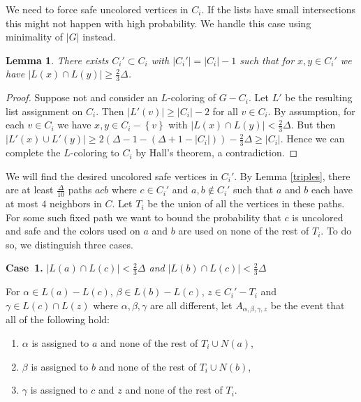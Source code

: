 \documentclass[12pt]{article}
\theoremstyle{plain}
\newtheorem{lem}[thm]{Lemma}
\theoremstyle{definition}
\theoremstyle{remark}
\newcommand{\set}[1]{\left\{ #1 \right\}}
\newcommand{\card}[1]{\left|#1\right|}
\begin{document}
We need to force safe uncolored vertices in $C_i$.  If the lists have small
intersections this might not happen with high probability.  We handle this case
using minimality of $\card{G}$ instead.

\begin{lem}\label{LargeIntersections}
There exists $C_i' \subset C_i$ with $\card{C_i'} = \card{C_i} - 1$ such that
for $x, y \in C_i'$ we have $\card{L(x) \cap L(y)} \geq \frac23 \Delta$.
\end{lem}
\begin{proof}
Suppose not and consider an $L$-coloring of $G - C_i$.  Let $L'$ be the
resulting list assignment on $C_i$.  Then $\card{L'(v)} \geq \card{C_i} - 2$ for
all $v \in C_i$.  By assumption, for each $v \in C_i$ we have $x, y \in C_i -
\set{v}$ with $\card{L(x) \cap L(y)} < \frac23 \Delta$.  But then $\card{L'(x) \cup
L'(y)} \geq 2(\Delta - 1 - (\Delta + 1 - \card{C_i})) - \frac23 \Delta \geq
\card{C_i}$.  Hence we can complete the $L$-coloring to $C_i$ by Hall's theorem,
a contradiction.
\end{proof}

We will find the desired uncolored safe vertices in $C_i'$.  By Lemma
\ref{triples}, there are at least $\frac{\Delta}{10}$ paths $acb$ where $c \in
C_i'$ and $a,b \not \in C_i'$ such that $a$ and $b$ each have at most $4$
neighbors in $C$.  Let $T_i$ be the union of all the vertices in these paths. 
For some such fixed path we want to bound the probability that $c$ is uncolored and safe and the colors used on $a$ and $b$ are used on
none of the rest of $T_i$.  To do so, we distinguish three cases.

\textbf{Case~1.} \textit{$\card{L(a) \cap L(c)} < \frac23 \Delta$ and
$\card{L(b) \cap L(c)} < \frac23 \Delta$}

For $\alpha \in L(a) - L(c)$, $\beta \in L(b) - L(c)$, $z \in C_i' - T_i$ and
$\gamma \in L(c) \cap L(z)$ where $\alpha, \beta, \gamma$ are all different, let
$A_{\alpha, \beta, \gamma, z}$ be the event that all of the following hold:

\begin{enumerate}
  \item $\alpha$ is assigned to $a$ and none of the rest of $T_i \cup N(a)$,
  \item $\beta$ is assigned to $b$ and none of the rest of $T_i \cup N(b)$,
  \item $\gamma$ is assigned to $c$ and $z$ and none of the rest of $T_i$.
\end{enumerate}
\end{document}
